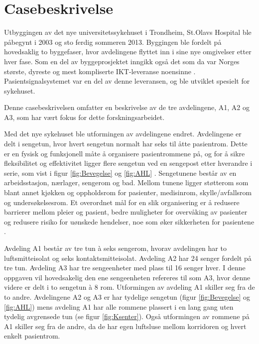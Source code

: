 \chapter{Casebeskrivelse}
\label{chp:case}
Utbyggingen av det nye universitetssykehuset i Trondheim, St.Olavs Hospital ble påbegynt i 2003 og sto ferdig sommeren 2013. Byggingen ble fordelt på hovedsaklig to byggefaser, hvor avdelingene flyttet inn i sine nye omgivelser etter hver fase. Som en del av byggeprosjektet inngikk også det som da var Norges største, dyreste og mest kompliserte IKT-leveranse noensinne \citep{TU}. Pasientsignalsystemet var en del av denne leveransen, og ble utviklet spesielt for sykehuset. 

\noindent
Denne casebeskrivelsen omfatter en beskrivelse av de tre avdelingene, A1, A2 og A3, som har vært fokus for dette forskningsarbeidet. 

\noindent
Med det nye sykehuset ble utformingen av avdelingene endret. Avdelingene er delt i sengetun, hvor hvert sengetun normalt har seks til åtte pasientrom. Dette er en fysisk og funksjonell måte å organisere pasientrommene på, og for å sikre fleksibilitet og effektivitet ligger flere sengetun ved en sengepost etter hverandre i serie, som vist i figur \ref{fig:Bevegelse} og \ref{fig:AHL} \citep{Aslaksen, sykehuskart}. Sengetunene består av en arbeidsstasjon, nærlager, sengerom og bad. Mellom tunene ligger støtterom som blant annet kjøkken og oppholdsrom for pasienter, medisinrom, skylle/avfallsrom og undersøkelsesrom. Et overordnet mål for en slik organisering er å redusere barrierer mellom pleier og pasient, bedre muligheter for overvåking av pasienter og redusere risiko for uønskede hendelser, noe som øker sikkerheten for pasientene \citep{Sintef-sengetun}.

\noindent
Avdeling A1 består av tre tun à seks sengerom, hvorav avdelingen har to luftsmitteisolat og seks kontaktsmitteisolat. Avdeling A2 har 24 senger fordelt på tre tun. Avdeling A3 har tre sengeenheter med plass til 16 senger hver. I denne oppgaven vil hovedsakelig den ene sengeenheten refereres til som A3, hvor denne videre er delt i to sengetun à 8 rom.
Utformingen av avdeling A1 skiller seg fra de to andre.
Avdelingene A2 og A3 er har tydelige sengetun (figur \ref{fig:Bevegelse} og \ref{fig:AHL}) mens avdeling A1 har alle rommene plassert i en lang gang uten tydelig avgrensede tun (se figur \ref{fig:Ksenter}). Også utformingen av rommene på A1 skiller seg fra de andre, da de har egen luftsluse mellom korridoren og hvert enkelt pasientrom.

